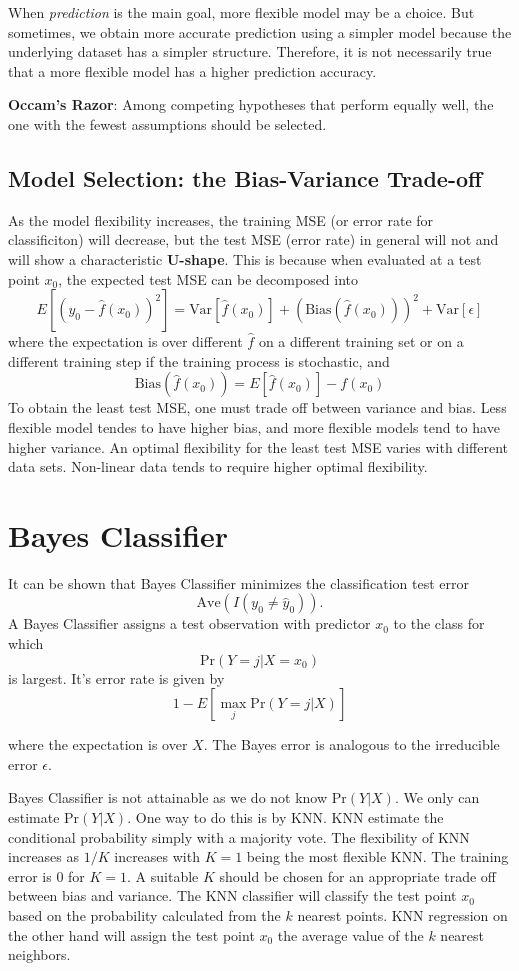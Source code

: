\documentclass[
  letterpaper,
  DIV=11,
  numbers=noendperiod]{scrreprt}
\begin{document}
When \emph{prediction} is the main goal, more flexible model may be a
choice. But sometimes, we obtain more accurate prediction using a
simpler model because the underlying dataset has a simpler structure.
Therefore, it is not necessarily true that a more flexible model has a
higher prediction accuracy.

\textbf{Occam's Razor}: Among competing hypotheses that perform equally
well, the one with the fewest assumptions should be selected.

\subsection{Model Selection: the Bias-Variance
Trade-off}\label{model-selection-the-bias-variance-trade-off}

As the model flexibility increases, the training MSE (or error rate for
classificiton) will decrease, but the test MSE (error rate) in general
will not and will show a characteristic \textbf{U-shape}. This is
because when evaluated at a test point \(x_0\), the expected test MSE
can be decomposed into \[
E\left[ (y_0-\hat{f}(x_0))^2 \right] = \text{Var}[\hat{f}(x_0)] + (\text{Bias}(\hat{f}(x_0)))^2+\text{Var}[\epsilon]
\] where the expectation is over different \(\hat{f}\) on a different
training set or on a different training step if the training process is
stochastic, and \[
\text{Bias}(\hat{f}(x_0))= E[\hat{f}(x_0)]-f(x_0)
\] To obtain the least test MSE, one must trade off between variance and
bias. Less flexible model tendes to have higher bias, and more flexible
models tend to have higher variance. An optimal flexibility for the
least test MSE varies with different data sets. Non-linear data tends to
require higher optimal flexibility.

\section{Bayes Classifier}\label{bayes-classifier}

It can be shown that Bayes Classifier minimizes the classification test
error \[
\text{Ave}(I(y_0\ne \hat{y}_0)).
\] A Bayes Classifier assigns a test observation with predictor \(x_0\)
to the class for which \[
\text{Pr}(Y=j|X=x_0)
\] is largest. It's error rate is given by \[
1-E[\max_{j} \text{Pr}(Y=j|X)]
\]

where the expectation is over \(X\). The Bayes error is analogous to the
irreducible error \(\epsilon\).

Bayes Classifier is not attainable as we do not know \(\text{Pr}(Y|X)\).
We only can estimate \(\text{Pr}(Y|X)\). One way to do this is by KNN.
KNN estimate the conditional probability simply with a majority vote.
The flexibility of KNN increases as \(1/K\) increases with \(K=1\) being
the most flexible KNN. The training error is 0 for \(K=1\). A suitable
\(K\) should be chosen for an appropriate trade off between bias and
variance. The KNN classifier will classify the test point \(x_0\) based
on the probability calculated from the \(k\) nearest points. KNN
regression on the other hand will assign the test point \(x_0\) the
average value of the \(k\) nearest neighbors.
\end{document}
